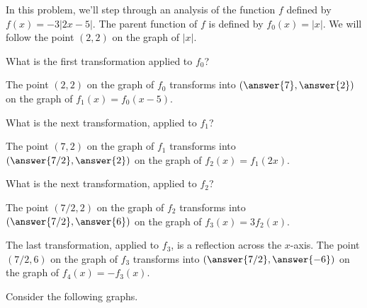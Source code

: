 \documentclass{ximera}
\author{Kenneth Berglund}
\begin{document}
In this problem, we'll step through an analysis of the function $f$ defined by $f(x) = -3|2x - 5|$. The parent function of $f$ is defined by $f_0(x) = |x|$. We will follow the point $(2, 2)$ on the graph of $|x|$. 
\begin{exercise}
What is the first transformation applied to $f_0$? 
\begin{multipleChoice}
\end{multipleChoice}

\begin{exercise}
The point $(2,2)$ on the graph of $f_0$ transforms into $(\answer{7}, \answer{2})$ on the graph of $f_1(x) = f_0(x - 5)$. 

\begin{exercise}
What is the next transformation, applied to $f_1$?
\begin{multipleChoice}
\end{multipleChoice}

\begin{exercise}
The point $(7,2)$ on the graph of $f_1$ transforms into $(\answer{7/2}, \answer{2})$ on the graph of $f_2(x) = f_1\left(2x\right)$. 

\begin{exercise}
What is the next transformation, applied to $f_2$?
\begin{multipleChoice}
\end{multipleChoice}

\begin{exercise}
The point $(7/2, 2)$ on the graph of $f_2$ transforms into $(\answer{7/2}, \answer{6})$ on the graph of $f_3(x) = 3f_2\left(x\right)$. 

\begin{exercise}
The last transformation, applied to $f_3$, is a reflection across the $x$-axis. The point $(7/2,6)$ on the graph of $f_3$ transforms into $(\answer{7/2}, \answer{-6})$ on the graph of $f_4(x) = -f_3(x)$. 

\begin{exercise}
Consider the following graphs.


\end{exercise}
\end{exercise}
\end{exercise}
\end{exercise}
\end{exercise}
\end{exercise}
\end{exercise}
\end{exercise}
\end{document}

